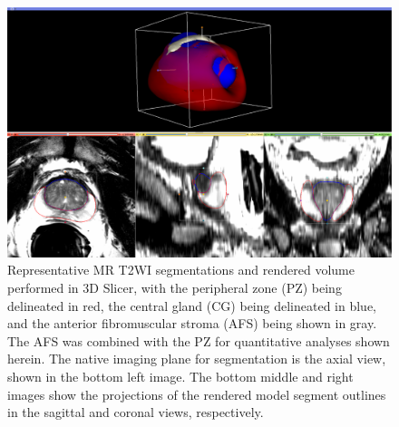 \begin{figure}[htb!]
\centering
\includegraphics[width=1.0\textwidth]{figs/MR_P79_SegsVol.eps}
\caption{Representative MR T2WI segmentations and rendered volume performed in
    3D Slicer, with the peripheral zone (PZ) being delineated in red, the
    central gland (CG) being delineated in blue, and the anterior fibromuscular
    stroma (AFS) being shown in gray.  The AFS was combined with the PZ for
    quantitative analyses shown herein.  The native imaging plane for
    segmentation is the axial view, shown in the bottom left image.  The bottom
    middle and right images show the projections of the rendered model segment
    outlines in the sagittal and coronal views, respectively.}
\label{fig:mr_segs_vol} 
\end{figure}

